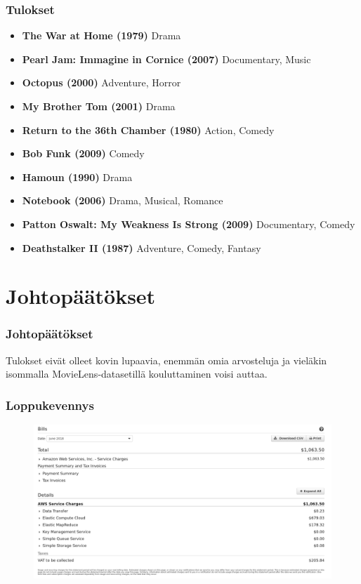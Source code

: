 \documentclass{beamer}
\begin{document}

\begin{frame}
\frametitle{Tulokset}

\begin{itemize}
	\item \textbf{The War at Home (1979)} Drama
	\item \textbf{Pearl Jam: Immagine in Cornice (2007)} Documentary, Music
	\item \textbf{Octopus (2000)} Adventure, Horror
	\item \textbf{My Brother Tom (2001)} Drama
	\item \textbf{Return to the 36th Chamber (1980)} Action, Comedy
	\item \textbf{Bob Funk (2009)} Comedy
	\item \textbf{Hamoun (1990)} Drama
	\item \textbf{Notebook (2006)} Drama, Musical, Romance
	\item \textbf{Patton Oswalt: My Weakness Is Strong (2009)} Documentary, Comedy
	\item \textbf{Deathstalker II (1987)} Adventure, Comedy, Fantasy
\end{itemize}

\end{frame}


\section{Johtopäätökset}

\begin{frame}
\frametitle{Johtopäätökset}

Tulokset eivät olleet kovin lupaavia, enemmän omia arvosteluja ja vieläkin isommalla MovieLens-datasetillä kouluttaminen voisi auttaa.

\end{frame}


\begin{frame}
\frametitle{Loppukevennys}

\begin{figure}[h]
	\centering
	\includegraphics[scale=0.2]{../images/aws_bill}
\end{figure}

\end{frame}
\end{document}
